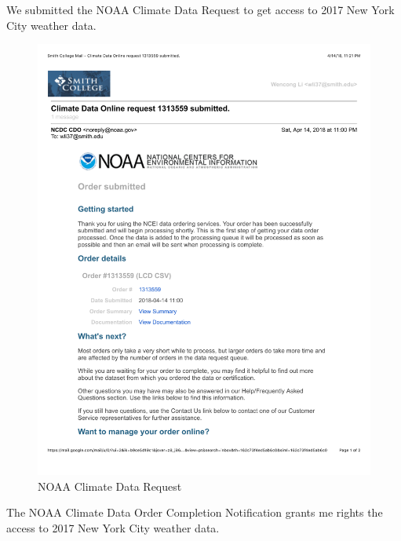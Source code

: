 \documentclass[12pt,twoside]{reedthesis}
\theoremstyle{definition}
\theoremstyle{definition}
\theoremstyle{definition}
\theoremstyle{remark}
\begin{document}
We submitted the NOAA Climate Data Request to get access to 2017 New
York City weather data.
\begin{figure}

{\centering \includegraphics[width=5.8in]{figure/app_noaa_request} 

}

\caption{NOAA Climate Data Request}\label{fig:noaareq}
\end{figure}
The NOAA Climate Data Order Completion Notification grants me rights the
access to 2017 New York City weather data.
\end{document}
